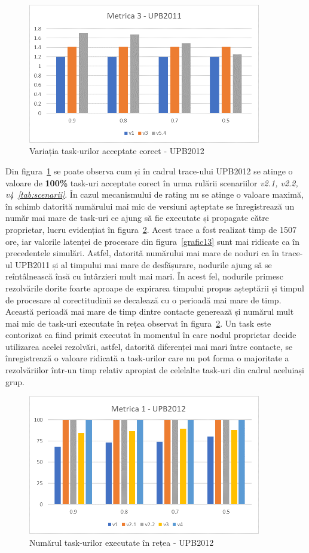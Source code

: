 \documentclass[12pt,a4paper]{report}
\begin{document}
\iftrue
\begin{figure}[th]
\centering
\includegraphics[width=4in]{pics/graphics/grafic10.png}
  \caption[]{Variația task-urilor acceptate corect - UPB2012}
  \label{grafic11}
\end{figure}
\fi

Din figura~\ref{grafic11} se poate observa cum și în cadrul trace-ului UPB2012 se atinge o valoare de \textbf{100\%} task-uri acceptate corect în urma rulării scenariilor \textit{v2.1, v2.2, v4~\ref{tab:scenarii}}. În cazul mecanismului de rating nu se atinge o valoare maximă, în schimb datorită numărului mai mic de versiuni așteptate se înregistrează un număr mai mare de task-uri ce ajung să fie executate și propagate către proprietar, lucru evidențiat în figura~\ref{grafic12}. Acest trace a fost realizat timp de 1507 ore, iar valorile latenței de procesare din figura~\ref{grafic13} sunt mai ridicate ca în precedentele simulări.  Astfel, datorită numărului mai mare de noduri ca în trace-ul UPB2011 și al timpului mai mare de desfășurare, nodurile ajung să se reîntâlnească însă cu întârzieri mult mai mari. În acest fel, nodurile primesc rezolvările dorite foarte aproape de expirarea timpului propus așteptării și timpul de procesare al corectitudinii se decalează cu o perioadă mai mare de timp. Această perioadă mai mare de timp dintre contacte generează și numărul mult mai mic de task-uri executate în rețea observat în figura~\ref{grafic12}. Un task este contorizat ca fiind primit executat în momentul în care nodul proprietar decide utilizarea acelei rezolvări, astfel, datorită diferenței mai mari între contacte, se înregistrează o valoare ridicată a task-urilor care nu pot forma o majoritate a rezolvăriilor într-un timp relativ apropiat de celelalte task-uri din cadrul aceluiași grup.
\iftrue
\begin{figure}[th]
\centering
\includegraphics[width=4in]{pics/graphics/grafic11.png}
  \caption[]{Numărul task-urilor executate în rețea - UPB2012}
  \label{grafic12}
\end{figure}
\fi
\end{document}

